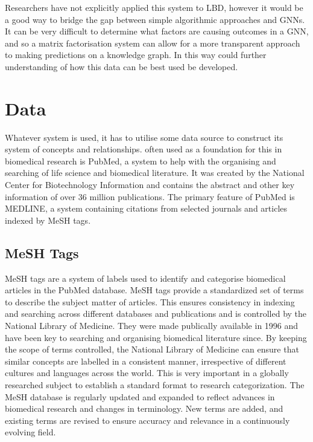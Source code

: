 \documentclass{l4proj}
\begin{document}
Researchers have not explicitly applied this system to LBD, however it would be a good way to bridge the gap between simple algorithmic approaches and GNNs. It can be very difficult to determine what factors are causing outcomes in a GNN, and so a matrix factorisation system can allow for a more transparent approach to making predictions on a knowledge graph. In this way could further understanding of how this data can be best used be developed. \\ 

\section{Data}

Whatever system is used, it has to utilise some data source to construct its system of concepts and relationships. often used as a foundation for this in biomedical research is PubMed, a system to help with the organising and searching of life science and biomedical literature. It was created by the National Center for Biotechnology Information and contains the abstract and other key information of over 36 million publications. The primary feature of PubMed is MEDLINE, a system containing citations from selected journals and articles indexed by MeSH tags. \\

\subsection{MeSH Tags}

MeSH tags are a system of labels used to identify and categorise biomedical articles in the PubMed database. MeSH tags provide a standardized set of terms to describe the subject matter of articles. This ensures consistency in indexing and searching across different databases and publications and is controlled by the National Library of Medicine. They were made publically available in 1996 and have been key to searching and organising biomedical literature since. By keeping the scope of terms controlled, the National Library of Medicine can ensure that similar concepts are labelled in a consistent manner, irrespective of different cultures and languages across the world. This is very important in a globally researched subject to establish a standard format to research categorization. The MeSH database is regularly updated and expanded to reflect advances in biomedical research and changes in terminology. New terms are added, and existing terms are revised to ensure accuracy and relevance in a continuously evolving field. \\
\end{document}
